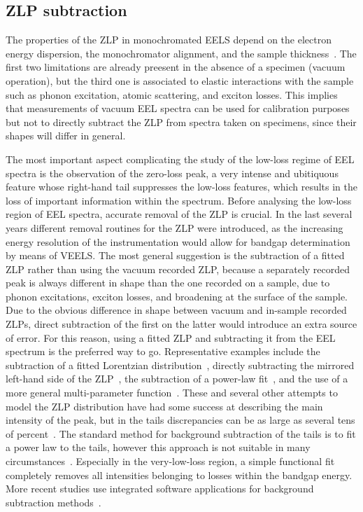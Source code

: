 \subsection{ZLP subtraction}
The properties of the ZLP in monochromated EELS depend on the electron energy dispersion,
the monochromator alignment, and the sample thickness~\cite{Park:2008, Stoger:2008}.
%
The first two limitations are already preesent in the absence of a specimen (vacuum operation),
but the third one is associated
to elastic interactions with the sample such as 
phonon excitation, atomic scattering, and exciton losses.
%
This implies that measurements of vacuum EEL spectra can be used for calibration purposes
but not to directly subtract the ZLP from spectra taken on specimens, since their shapes will differ
in general.


The most important aspect complicating the study of the low-loss regime of EEL spectra 
is the observation of the zero-loss peak, a very intense and ubitiquous feature 
whose right-hand tail suppresses the low-loss features, which results in the loss
of important information within the spectrum.
%
Before analysing the low-loss region of EEL spectra, accurate removal of the
ZLP is crucial. 
%
In the last several years different removal routines for the ZLP were introduced, 
as the increasing energy resolution of the instrumentation would allow for bandgap 
determination by means of VEELS. 
%
The most general suggestion is the subtraction of a fitted ZLP rather than 
using the vacuum recorded ZLP, because a separately recorded peak is always 
different in shape than the one recorded on a sample, due to phonon excitations, 
exciton losses, and broadening at the surface of the sample.
%
Due to the obvious difference in shape between vacuum and in-sample recorded ZLPs, 
direct subtraction of the first on the latter would introduce an extra
source of error. 
%
For this reason, using a fitted ZLP and subtracting it from the EEL spectrum 
is the preferred way to go.
%
Representative examples include the subtraction of a fitted Lorentzian distribution~\cite{Dorneich:1998},
directly subtracting the mirrored left-hand side of the ZLP~\cite{Lazar:2003},
the subtraction of a power-law fit~\cite{Erni:2005}, and the use of a
more general multi-parameter function~\cite{Benthem:2001}.
%
These and several other attempts to model the ZLP distribution 
have had some success at describing the main intensity of the peak, 
but in the tails discrepancies can be as large as several tens of percent~\cite{Bangert:2003}.
%
The standard method for background subtraction of the tails
is to fit a power law to the tails, however this approach is not suitable in
many circumstances~\cite{Hachtel:2018, Tenailleau:1992, Reed:2002, Bosman:2006}.
%
Especially in the very-low-loss region, a simple functional fit completely
removes all intensities belonging to losses within the bandgap energy.
%
More recent studies use integrated software applications for background subtraction 
methods~\cite{Egerton:10.1016/S0304-3991(01)00155-3, Held:2020, Granerod:2018, Fung:2020}.\\

